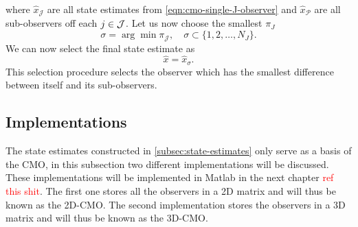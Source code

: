 where $\hat{x}_{\mathcal{J}}$ are all state estimates from \eqref{eqn:cmo-single-J-observer} and $\hat{x}_{\mathcal{P}}$ are all sub-observers off each $j \in \mathcal{J}$. Let us now choose the smallest $\pi_J$
\begin{equation}
    \sigma = \arg \min \pi_{\mathcal{J}}, \quad \sigma \subset \{1,2,\dots,N_J\}.
\end{equation}
We can now select the final state estimate as
\begin{equation}
    \hat{x} = \hat{x}_{\sigma}.
\end{equation}
This selection procedure selects the observer which has the smallest difference between itself and its sub-observers. 

\subsection{Implementations}
The state estimates constructed in \ref{subsec:state-estimates} only serve as a basis of the CMO, in this subsection two different implementations will be discussed. These implementations will be implemented in Matlab in the next chapter \textcolor{red}{ref this shit}. The first one  stores all the observers in a 2D matrix and will thus be known as the 2D-CMO. The second implementation stores the observers in a 3D matrix and will thus be known as the 3D-CMO.

